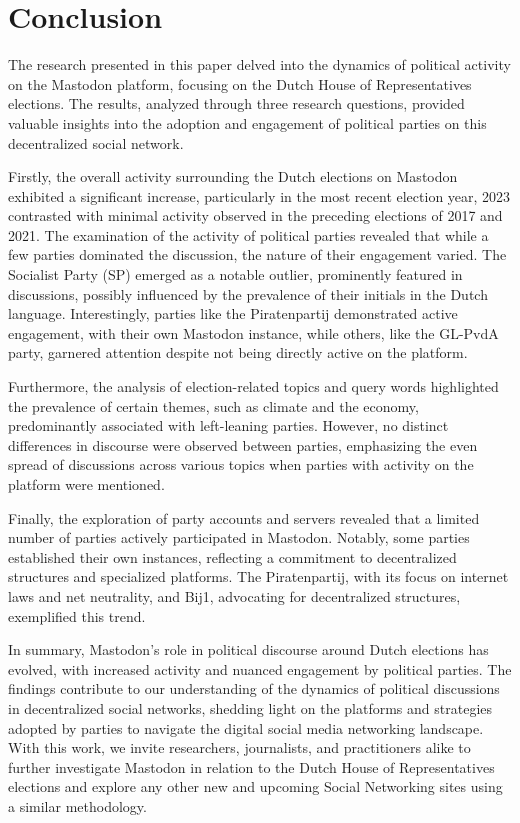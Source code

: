 \section{Conclusion}


The research presented in this paper delved into the dynamics of political activity on the Mastodon platform, focusing on the Dutch House of Representatives elections. The results, analyzed through three research questions, provided valuable insights into the adoption and engagement of political parties on this decentralized social network.

Firstly, the overall activity surrounding the Dutch elections on Mastodon exhibited a significant increase, particularly in the most recent election year, 2023 contrasted with minimal activity observed in the preceding elections of 2017 and 2021.
The examination of the activity of political parties revealed that while a few parties dominated the discussion, the nature of their engagement varied. 
The Socialist Party (SP) emerged as a notable outlier, prominently featured in discussions, possibly influenced by the prevalence of their initials in the Dutch language. Interestingly, parties like the Piratenpartij demonstrated active engagement, with their own Mastodon instance, while others, like the GL-PvdA party, garnered attention despite not being directly active on the platform.

Furthermore, the analysis of election-related topics and query words highlighted the prevalence of certain themes, such as climate and the economy, predominantly associated with left-leaning parties.
However, no distinct differences in discourse were observed between parties, emphasizing the even spread of discussions across various topics when parties with activity on the platform were mentioned.

Finally, the exploration of party accounts and servers revealed that a limited number of parties actively participated in Mastodon. Notably, some parties established their own instances, reflecting a commitment to decentralized structures and specialized platforms. The Piratenpartij, with its focus on internet laws and net neutrality, and Bij1, advocating for decentralized structures, exemplified this trend.

In summary, Mastodon's role in political discourse around Dutch elections has evolved, with increased activity and nuanced engagement by political parties. The findings contribute to our understanding of the dynamics of political discussions in decentralized social networks, shedding light on the platforms and strategies adopted by parties to navigate the digital social media networking landscape. With this work, we invite researchers, journalists, and practitioners alike to further investigate Mastodon in relation to the Dutch House of Representatives elections and explore any other new and upcoming Social Networking sites using a similar methodology.